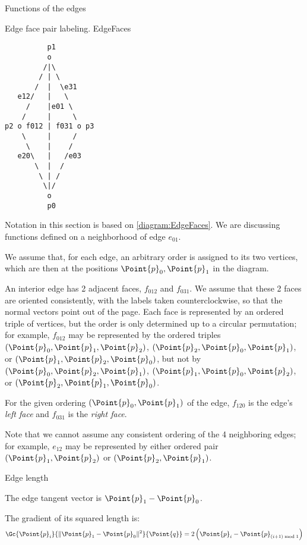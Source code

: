 \begin{plSection}{Functions of the edges}
\label{sec:edges}

\begin{plDiagram}
{Edge face pair labeling.}
{EdgeFaces}
\centering
\begin{verbatim}
          p1
          o
         /|\
        / | \
       /  |  \e31
   e12/   |   \
     /    |e01 \
    /     |     \
p2 o f012 | f031 o p3
    \     |     /
     \    |    /
   e20\   |   /e03
       \  |  /
        \ | /
         \|/
          o
          p0
\end{verbatim}
\end{plDiagram}

Notation in this section is based on \cref{diagram:EdgeFaces}.
We are discussing functions defined on a neighborhood of edge $e_{01}$.

We assume that, for each edge, an arbitrary order is assigned to
its two vertices, which are then at the positions $\Point{p}_0,\Point{p}_1$ in the diagram.

An interior edge has 2 adjacent faces, $f_{012}$ and $f_{031}$.
We assume that these 2 faces are oriented consistently, with the labels
taken counterclockwise, so that the normal vectors point out of the page.
Each face is represented by an ordered triple of vertices,
but the order is only determined up to a circular permutation;
for example, $f_{012}$ may be represented by the ordered triples
$(\Point{p}_0,\Point{p}_1,\Point{p}_2)$, 
$(\Point{p}_2,\Point{p}_0,\Point{p}_1)$, or 
$(\Point{p}_1,\Point{p}_2,\Point{p}_0)$,
but not by
$(\Point{p}_0,\Point{p}_2,\Point{p}_1)$, 
$(\Point{p}_1,\Point{p}_0,\Point{p}_2)$, or
 $(\Point{p}_2,\Point{p}_1,\Point{p}_0)$.

For the given ordering $(\Point{p}_0,\Point{p}_1)$ of the edge,
$f_{120}$ is the edge's {\it left face}
and $f_{031}$ is the {\it right face}.

Note that we cannot assume any consistent ordering of the 4 neighboring edges;
for example, $e_{12}$ may be represented by either ordered pair
$(\Point{p}_1,\Point{p}_2)$ or $(\Point{p}_2,\Point{p}_1)$.

\begin{plSection}{Edge length}
\label{sec:edge_length}

The edge tangent vector is $\Point{p}_1 - \Point{p}_0$.

The gradient of its squared length is:
\begin{equation}
\Gc{\Point{p}_i}{\| \Point{p}_1 - \Point{p}_0 \|^2}{\Point{q}} 
= 2 \left( \Point{p}_i - \Point{p}_{(i+1) \bmod 1} \right)
\end{equation}


\end{plSection}
\end{plSection}
